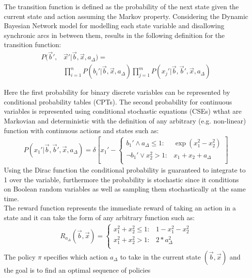 \documentclass[letterpaper]{article}
\begin{document}
The transition function is defined as the probability of the next state given the current state and action assuming the Markov property.  Considering the Dynamic Bayesian Network model for modelling each state variable and disallowing synchronic arcs in between them,  results in the following definition for the transition function:   
\begin{align}
P(\vec{b}',&\vec{x}'|\vec{b},\vec{x},a_{\Delta}) = \label{eq:dbn} \\
& \prod_{i=1}^n P(b_i'|\vec{b},\vec{x},a_{\Delta}) \prod_{j=1}^m P(x_j'|\vec{b},\vec{b}',\vec{x},a_{\Delta}) \nonumber 
\end{align}

Here the first probability for binary discrete variables can be represented by conditional probability tables (CPTs). The second probability for continuous variables is represented using conditional stochastic equations (CSEs) wthat are Markovian and deterministic with the definition of any arbitrary (e.g. non-linear) function with continuous actions and states such as:
\vspace{-3mm}
{\footnotesize
\begin{align}
P(x_1' | \vec{b},\vec{b}',\vec{x},a_{\Delta}) = \delta\left[ x_1' - 
\begin{cases}
b_1' \land a_{\Delta} \leq 1 : & \exp(x_1^2 - x_2^2) \\
\neg b_1' \lor  x_2^2 > 1 : & x_1 + x_2 +a_{\Delta} \\
\end{cases}
\right] \label{eq:ex_csde}
\end{align}}
Using the Dirac function the conditional probability is guaranteed to integrate to 1 over the variable, furthermore the probability is stochastic since it conditions on Boolean random variables as well as sampling them stochastically at the same time. \\
The reward function represents the immediate reward of taking an action in a state and it can take the form of any arbitrary function such as:
\begin{align}
R_{a_{\Delta}}(\vec{b},\vec{x}) = \begin{cases}
x_1^2 + x_2^2 \leq 1 : & 1 - x_1^2 - x_2^2  \\
x_1^2 + x_2^2 > 1 : & 2 * a_{\Delta}^2 \\
\end{cases} \label{eq:simple_reward}
\end{align}
The policy $\pi$ specifies which action $a_{\Delta}$ to take in the current state  $(\vec{b},\vec{x})$ and the goal is to find an optimal sequence of policies
\end{document}
